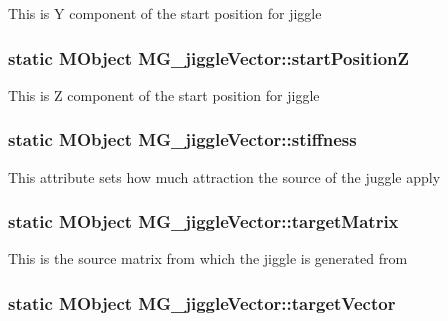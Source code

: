 This is Y component of the start position for jiggle \hypertarget{class_m_g__jiggle_vector_a8934def35cd8c24f2af9c0f0edc03858}{
\subsubsection[{start\-Position\-Z}]{\setlength{\rightskip}{0pt plus 5cm}static M\-Object M\-G\-\_\-jiggle\-Vector\-::start\-Position\-Z\hspace{0.3cm}{\ttfamily [static]}}}\label{class_m_g__jiggle_vector_a8934def35cd8c24f2af9c0f0edc03858}
This is Z component of the start position for jiggle \hypertarget{class_m_g__jiggle_vector_a41ea7a211dd0a1b21dd425aa39f3e358}{
\subsubsection[{stiffness}]{\setlength{\rightskip}{0pt plus 5cm}static M\-Object M\-G\-\_\-jiggle\-Vector\-::stiffness\hspace{0.3cm}{\ttfamily [static]}}}\label{class_m_g__jiggle_vector_a41ea7a211dd0a1b21dd425aa39f3e358}
This attribute sets how much attraction the source of the juggle apply \hypertarget{class_m_g__jiggle_vector_a6e7dbbc9a06941e0b932b71e31050e32}{
\subsubsection[{target\-Matrix}]{\setlength{\rightskip}{0pt plus 5cm}static M\-Object M\-G\-\_\-jiggle\-Vector\-::target\-Matrix\hspace{0.3cm}{\ttfamily [static]}}}\label{class_m_g__jiggle_vector_a6e7dbbc9a06941e0b932b71e31050e32}
This is the source matrix from which the jiggle is generated from \hypertarget{class_m_g__jiggle_vector_a9efc733e10f8b37b8ab5778c558d4668}{
\subsubsection[{target\-Vector}]{\setlength{\rightskip}{0pt plus 5cm}static M\-Object M\-G\-\_\-jiggle\-Vector\-::target\-Vector\hspace{0.3cm}{\ttfamily [static]}}}\label{class_m_g__jiggle_vector_a9efc733e10f8b37b8ab5778c558d4668}
